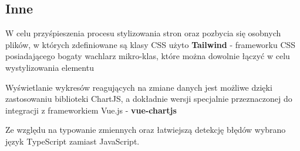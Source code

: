 \subsection{Inne}
W celu przyśpieszenia procesu stylizowania stron oraz pozbycia się osobnych plików, w których zdefiniowane są klasy CSS
użyto \textbf{Tailwind} - frameworku CSS posiadającego bogaty wachlarz mikro-klas, które można dowolnie łączyć w celu
wystylizowania elementu \cite{tailwind-css}

Wyświetlanie wykresów reagujących na zmiane danych jest możliwe dzięki zastosowaniu biblioteki ChartJS, a dokładnie
wersji specjalnie przeznaczonej do integracji z frameworkiem Vue.js - \textbf{vue-chartjs} \cite{chart-js} \cite{vue-chartjs}

Ze względu na typowanie zmiennych oraz łatwiejszą detekcję błędów wybrano język TypeScript zamiast JavaScript.